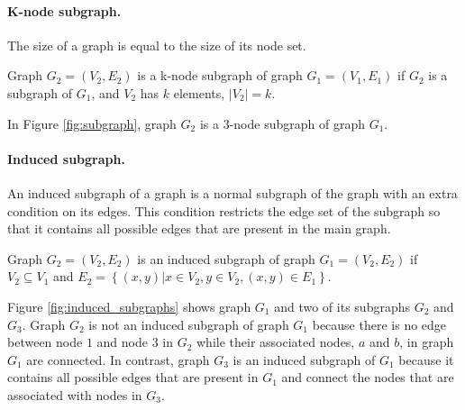 \paragraph{K-node subgraph.}
The size of a graph is equal to the size of its node set. 

\begin{definition}
Graph $G_2 = \left( V_2 , E_2 \right)$ is a k-node subgraph of graph $G_1 = \left( V_1, E_1 \right)$ if $G_2$ is a subgraph of $G_1$, and $V_2$ has $k$ elements, $|V_2|=k$. 
\end{definition}

In Figure \ref{fig:subgraph}, graph $G_2$ is a 3-node subgraph of graph $G_1$. 

\paragraph{Induced subgraph.} 
An induced subgraph of a graph is a normal subgraph of the graph with an extra condition on its edges.  
This condition restricts the edge set of the subgraph so that it contains all possible edges that are present in the main graph.

\begin{definition} 
Graph $G_2 = (V_2, E_2)$ is an induced subgraph of graph $G_1 = (V_2, E_2)$ if $V_2 \subseteq V_1$ and 
$E_2 = \left\{ (x,y)| x \in V_2, y \in V_2, (x,y) \in E_1   \right\}$.
\end{definition}

Figure \ref{fig:induced_subgraphs} shows graph $G_1$ and two of its subgraphs $G_2$ and $G_3$.  
Graph $G_2$ is not an induced subgraph of graph $G_1$ because there is no edge between node $1$ and node $3$ in $G_2$ while their associated nodes, $a$ and $b$, in graph $G_1$ are connected. 
In contrast, graph $G_3$ is an induced subgraph of $G_1$ because it contains all possible edges that are present in $G_1$ and connect the nodes that are associated with nodes in $G_3$.  


